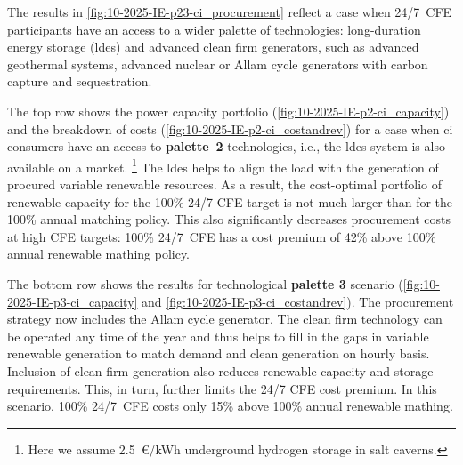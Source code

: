 The results in \cref{fig:10-2025-IE-p23-ci_procurement} reflect a case when 24/7~CFE participants have an access to a wider palette of technologies: 
long-duration energy storage (\gls{ldes}) and advanced clean firm generators, such as advanced geothermal systems, advanced nuclear or Allam cycle generators with carbon capture and sequestration.

The top row shows the power capacity portfolio (\cref{fig:10-2025-IE-p2-ci_capacity}) and the breakdown of costs (\cref{fig:10-2025-IE-p2-ci_costandrev}) for a case when \gls{ci} consumers have an access to \textbf{palette~2} technologies, i.e., the \gls{ldes} system is also available on a market.%
\footnote{Here we assume 2.5~\euro/kWh underground hydrogen storage in salt caverns.}
The \gls{ldes} helps to align the load with the generation of procured variable renewable resources. 
As a result, the cost-optimal portfolio of renewable capacity for the 100\% 24/7 CFE target is not much larger than for the 100\% annual matching policy. 
This also significantly decreases procurement costs at high CFE targets: 100\% 24/7~CFE has a cost premium of 42\% above 100\% annual renewable mathing policy.

The bottom row shows the results for technological \textbf{palette 3} scenario (\cref{fig:10-2025-IE-p3-ci_capacity} and \cref{fig:10-2025-IE-p3-ci_costandrev}). 
The procurement strategy now includes the Allam cycle generator.
The clean firm technology can be operated any time of the year and thus helps to fill in the gaps in variable renewable generation to match demand and clean generation on hourly basis.
Inclusion of clean firm generation also reduces renewable capacity and storage requirements. 
This, in turn, further limits the 24/7 CFE cost premium.
In this scenario, 100\% 24/7~CFE costs only 15\% above 100\% annual renewable mathing.

